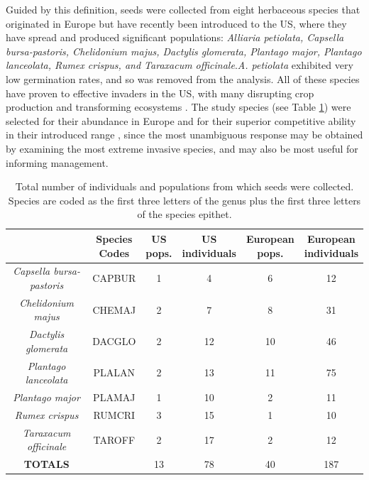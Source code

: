 \documentclass[12pt]{article}\usepackage[]{graphicx}\usepackage[]{color}
\begin{document}
	Guided by this definition, seeds were collected from eight herbaceous species that originated in Europe but have recently been introduced to the US, where they have spread and produced significant populations:\textit{ Alliaria petiolata, Capsella bursa-pastoris, Chelidonium majus, Dactylis glomerata, Plantago major, Plantago lanceolata, Rumex crispus, and Taraxacum officinale}.\textit{A. petiolata} exhibited very low germination rates, and so was removed from the analysis.  All of these species have proven to effective invaders in the US, with many disrupting crop production and transforming ecosystems \parencite[e.g.,][]{Froese2003,Wolfe2008}. The study species (see Table \ref{tab:seeds}) were selected for their abundance in Europe and for their superior competitive ability in their introduced range \parencite{Uva1997}, since the most unambiguous response may be obtained by examining the most extreme invasive species, and may also be most useful for informing management. 
	\begin{center}
		\begin{table}
			\centering
			\caption {Total number of individuals and populations from which seeds were collected. Species are coded as the first three letters of the genus plus the first three letters of the species epithet.} \label{tab:seeds}  
			\begin{tabular}{|c | c|c|c|c|c|}
				\hline 
				\makecell{\textbf{Species}} & \makecell{\textbf{Species}\\ \textbf{Codes}} & \makecell{\textbf{US} \\ \textbf{pops.}} & \makecell{\textbf{US} \\  \textbf{individuals}} & \makecell{\textbf{European} \\ \textbf{pops.}} & \makecell{\textbf{European} \\ \textbf{individuals}} \\
				\hline
				\textit{Capsella bursa-pastoris}&	CAPBUR	&1&	4&	6&	12\\
				\textit{Chelidonium majus}&	CHEMAJ&	2&	7&	8&	31\\
				\textit{Dactylis glomerata}&	DACGLO&	2&	12&	10&	46\\
				\textit{Plantago lanceolata}& PLALAN&	2&	13&	11&	75\\
				\textit{Plantago major}&	PLAMAJ&	1&	10&	2&	11\\
				\textit{Rumex crispus}&	RUMCRI& 	3&	15&	1&	10\\
				\textit{Taraxacum officinale}&	TAROFF&	2&	17&	2&	12\\
				\hline
				\textbf{TOTALS}	& &	13&	78&	40&	187\\
				\hline
			\end{tabular}
		\end{table}
	\end{center}
\end{document}
